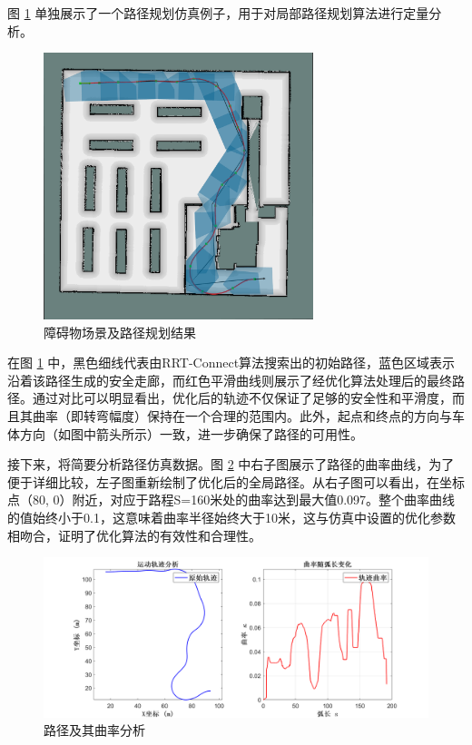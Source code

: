 \documentclass[master,academic]{ysuthesis} %
\begin{document}
		图 \ref{fig:single} 单独展示了一个路径规划仿真例子，用于对局部路径规划算法进行定量分析。
		\begin{figure}[!ht]
			\centering
			\includegraphics[width=0.7\textwidth]{single.png}
			\caption{障碍物场景及路径规划结果}
			\label{fig:single}
		\end{figure}
		
		在图 \ref{fig:single} 中，黑色细线代表由RRT-Connect算法搜索出的初始路径，蓝色区域表示沿着该路径生成的安全走廊，而红色平滑曲线则展示了经优化算法处理后的最终路径。通过对比可以明显看出，优化后的轨迹不仅保证了足够的安全性和平滑度，而且其曲率（即转弯幅度）保持在一个合理的范围内。此外，起点和终点的方向与车体方向（如图中箭头所示）一致，进一步确保了路径的可用性。

		接下来，将简要分析路径仿真数据。图 \ref{fig:datasingle} 中右子图展示了路径的曲率曲线，为了便于详细比较，左子图重新绘制了优化后的全局路径。从右子图可以看出，在坐标点（80, 0）附近，对应于路程S=160米处的曲率达到最大值0.097。整个曲率曲线的值始终小于0.1，这意味着曲率半径始终大于10米，这与仿真中设置的优化参数相吻合，证明了优化算法的有效性和合理性。

		\begin{figure}[!ht]
		\centering
		\includegraphics[width=1\textwidth]{datasingle.png}
		\caption{路径及其曲率分析}
		\label{fig:datasingle}
		\end{figure}
\end{document}
